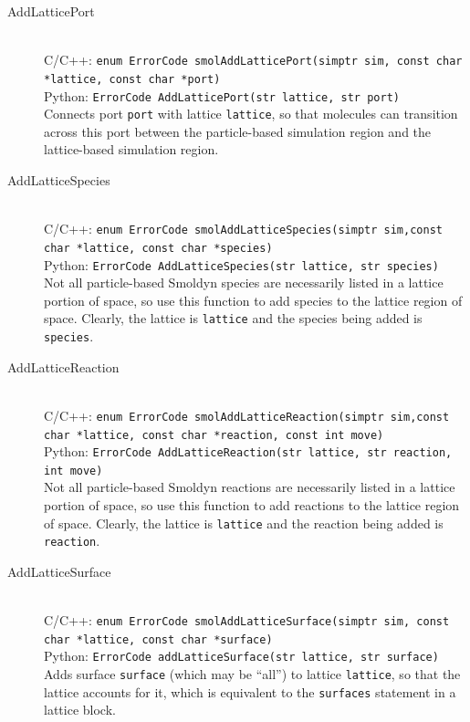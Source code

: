 \documentclass {scrbook}
\newcommand {\ttt} {\texttt}
\begin{document}
\begin{description}
\item[AddLatticePort]
\hfill \\
C/C++: \ttt{enum ErrorCode smolAddLatticePort(simptr sim, const char *lattice, const char *port)}\\
Python: \ttt{ErrorCode AddLatticePort(str lattice, str port)}\\
Connects port \ttt{port} with lattice \ttt{lattice}, so that molecules can transition across this port between the particle-based simulation region and the lattice-based simulation region.

\item[AddLatticeSpecies]
\hfill \\
C/C++: \ttt{enum ErrorCode smolAddLatticeSpecies(simptr sim,const char *lattice, const char *species)}\\
Python: \ttt{ErrorCode AddLatticeSpecies(str lattice, str species)}\\
Not all particle-based Smoldyn species are necessarily listed in a lattice portion of space, so use this function to add species to the lattice region of space. Clearly, the lattice is \ttt{lattice} and the species being added is \ttt{species}.

\item[AddLatticeReaction]
\hfill \\
C/C++: \ttt{enum ErrorCode smolAddLatticeReaction(simptr sim,const char *lattice, const char *reaction, const int move)}\\
Python: \ttt{ErrorCode AddLatticeReaction(str lattice, str reaction, int move)}\\
Not all particle-based Smoldyn reactions are necessarily listed in a lattice portion of space, so use this function to add reactions to the lattice region of space. Clearly, the lattice is \ttt{lattice} and the reaction being added is \ttt{reaction}.

\item[AddLatticeSurface]
\hfill \\
C/C++: \ttt{enum ErrorCode smolAddLatticeSurface(simptr sim, const char *lattice, const char *surface)}\\
Python: \ttt{ErrorCode addLatticeSurface(str lattice, str surface)}\\
Adds surface \ttt{surface} (which may be ``all'') to lattice \ttt{lattice}, so that the lattice accounts for it, which is equivalent to the \ttt{surfaces} statement in a lattice block.


\end{description}
\end{document}
